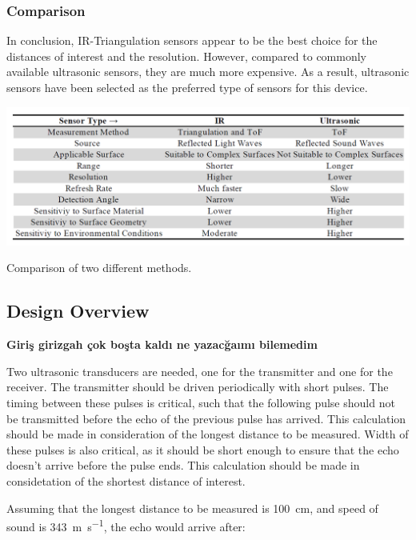 \documentclass[12pt, a4paper]{article}
\begin{document}
        \subsubsection{Comparison}
            In conclusion, IR-Triangulation sensors appear to be the best choice for the distances of interest and the resolution. However, compared to commonly available ultrasonic sensors, they are much more expensive. As a result, ultrasonic sensors have been selected as the preferred type of sensors for this device.

            \begin{table}[H]\centering
                \includegraphics[width=\textwidth]{comparison.png}
                \caption[]{Comparison of two different methods.}\label{tab:comparison}
            \end{table}


    \pagebreak
    \subsection{Design Overview}
        
        \textbf{Giriş girizgah çok boşta kaldı ne yazacğaımı bilemedim}
        
        \bigskip

        

        \bigskip

        Two ultrasonic transducers are needed, one for the transmitter and one for the receiver. The transmitter should be driven periodically with short pulses. The timing between these pulses is critical, such that the following pulse should not be transmitted before the echo of the previous pulse has arrived. This calculation should be made in consideration of the longest distance to be measured. Width of these pulses is also critical, as it should be short enough to ensure that the echo doesn't arrive before the pulse ends. This calculation should be made in considetation of the shortest distance of interest. 

        Assuming that the longest distance to be measured is \SI{100}{\centi\metre}, and speed of sound is \SI{343}{\metre\per\second}, the echo would arrive after:
\end{document}
